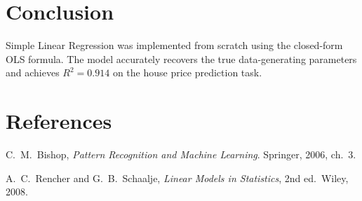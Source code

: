\documentclass[12pt,a4paper]{article}
\begin{document}
\section{Conclusion}

Simple Linear Regression was implemented from scratch using the closed-form OLS formula. The model accurately recovers the true data-generating parameters and achieves $R^2 = 0.914$ on the house price prediction task.

\section{References}
\begin{enumerate}[label={[\arabic*]}]
  \item C.\ M.\ Bishop, \textit{Pattern Recognition and Machine Learning}. Springer, 2006, ch.\ 3.
  \item A.\ C.\ Rencher and G.\ B.\ Schaalje, \textit{Linear Models in Statistics}, 2nd ed.\ Wiley, 2008.
\end{enumerate}
\end{document}
